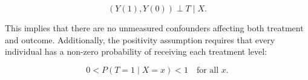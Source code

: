 \begin{equation}
(Y(1), Y(0)) \perp T \mid X.
\end{equation}

This implies that there are no unmeasured confounders affecting both treatment and outcome. Additionally, the positivity assumption requires that every individual has a non-zero probability of receiving each treatment level:

\begin{equation}
0 < P(T = 1 \mid X = x) < 1 \quad \text{for all } x.
\end{equation}








